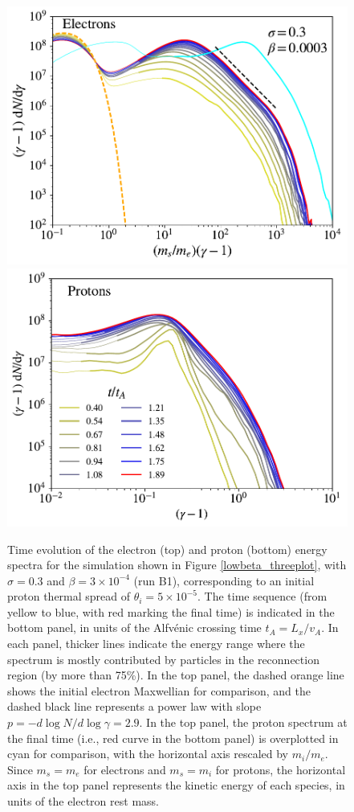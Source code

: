 \begin{figure}[htp]
	\centering
{
	\includegraphics[width=.5\linewidth]{sig_3_delgam00005_timespec.pdf}
}
{
	\includegraphics[width=.5\linewidth]{sig_3_delgam00005_timespec_ions.pdf}
}
\caption{Time evolution of the electron (top) and proton (bottom) energy spectra for the simulation shown in Figure \ref{lowbeta_threeplot}, with $\sigma=0.3$ and $\beta=3\times10^{-4}$ (run B1), corresponding to an initial proton thermal spread of $\theta_{i}=5 \times 10^{-5}$. The time sequence (from yellow to blue, with red marking the final time) is indicated in the bottom panel, in units of the Alfv\'enic crossing time $t_A=L_x/v_A$. In each panel, thicker lines indicate the energy range where the spectrum is mostly contributed  by particles in the reconnection region (by more than 75\%). In the top panel, the dashed orange line shows the initial electron Maxwellian for comparison, and the dashed black line represents a power law with slope $p=-d\log{N}/d\log{\gamma}=2.9$.
In the top panel, the proton spectrum at the final time (i.e., red curve in the bottom panel) is overplotted in cyan for comparison, with the horizontal axis rescaled by $m_i/m_e$. Since $m_s=m_e$ for electrons and $m_s=m_i$ for protons, the horizontal axis in the top panel represents the kinetic energy of each species, in units of the electron rest mass.}
\label{timespec}
\end{figure}


